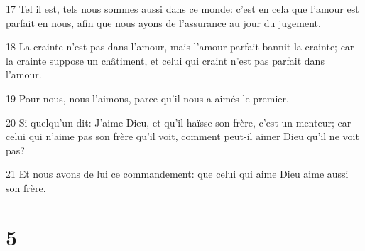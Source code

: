 \par 17 Tel il est, tels nous sommes aussi dans ce monde: c'est en cela que l'amour est parfait en nous, afin que nous ayons de l'assurance au jour du jugement.
\par 18 La crainte n'est pas dans l'amour, mais l'amour parfait bannit la crainte; car la crainte suppose un châtiment, et celui qui craint n'est pas parfait dans l'amour.
\par 19 Pour nous, nous l'aimons, parce qu'il nous a aimés le premier.
\par 20 Si quelqu'un dit: J'aime Dieu, et qu'il haïsse son frère, c'est un menteur; car celui qui n'aime pas son frère qu'il voit, comment peut-il aimer Dieu qu'il ne voit pas?
\par 21 Et nous avons de lui ce commandement: que celui qui aime Dieu aime aussi son frère.

\chapter{5}

